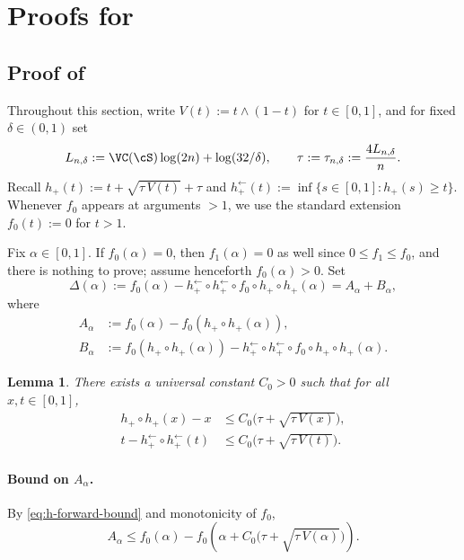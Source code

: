 \documentclass[english]{article}
\theoremstyle{plain}
\newtheorem{lemma}{Lemma}[section]
\theoremstyle{definition}
\newcommand{\hinv}{h_+^{\leftarrow}}
\newcommand{\hupup}{h_+\mathbin{\circ}h_+}                 %
\newcommand{\hinvinv}{h_+^{\leftarrow}\mathbin{\circ}h_+^{\leftarrow}}  %
\newcommand{\mgn}[1]{\tau+\sqrt{\tau\,V(#1)}}
\newcommand{\fnull}{f_0}
\newcommand{\falt}{f_1}
\begin{document}
\section{Proofs for }\label{app:rates}


\subsection{Proof of }\label{sec:proof-separation}

Throughout this section, write $V(t):=t\wedge(1-t)$ for $t\in[0,1]$, and for fixed $\delta\in(0,1)$ set
\[
L_{n,\delta}:=\VC(\cS)\log(2n)+\log(32/\delta),
\qquad
\tau:=\tau_{n,\delta}:=\frac{4L_{n,\delta}}{n}.
\]
Recall $h_+(t):=t+\sqrt{\tau\,V(t)}+\tau$ and $\hinv(t):=\inf\{s\in[0,1]: h_+(s)\geqslant t\}$. Whenever $\fnull$ appears at arguments $>1$, we use the standard extension $\fnull(t):=0$ for $t>1$.

Fix $\alpha\in[0,1]$. If $\fnull(\alpha)=0$, then $\falt(\alpha)=0$ as well since $0\leqslant \falt\leqslant \fnull$, and there is nothing to prove; assume henceforth $\fnull(\alpha)>0$. Set
\[
\Delta(\alpha):=\fnull(\alpha)-\hinvinv\circ \fnull\circ \hupup(\alpha)
=A_\alpha+B_\alpha,
\]
where
\begin{align*}
A_\alpha&:=\fnull(\alpha)-\fnull(\hupup(\alpha)),\\
B_\alpha&:=\fnull(\hupup(\alpha))-\hinvinv\circ \fnull\circ \hupup(\alpha).
\end{align*}

\begin{lemma}\label{lem:helper-lemma}
There exists a universal constant $C_0>0$ such that for all $x,t\in[0,1]$,
\begin{align}
\hupup(x)-x
&\leqslant C_0\bigl(\mgn{x}\bigr),
\label{eq:h-forward-bound}
\\
t-\hinvinv(t)
&\leqslant C_0\bigl(\mgn{t}\bigr).
\label{eq:h-backward-bound}
\end{align}
\end{lemma}

\paragraph{Bound on $A_\alpha$.} By \eqref{eq:h-forward-bound} and monotonicity of $\fnull$,
\begin{equation}
A_\alpha
\leqslant \fnull(\alpha)-\fnull\!\left(\alpha+C_0\bigl(\mgn{\alpha}\bigr)\right).
\label{eq:A-alpha-bound}
\end{equation}
\end{document}
